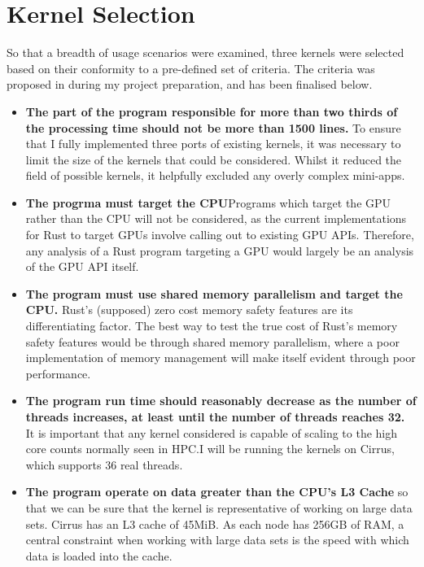 \section{Kernel Selection}
So that a breadth of usage scenarios were examined, three kernels were selected based on their conformity to a pre-defined set of criteria. The criteria was proposed in during my project preparation, and has been finalised below.
\begin{itemize}
  \item \textbf{The part of the program responsible for more than two thirds of the processing time should not be more than 1500 lines.} To ensure that I fully implemented three ports of existing kernels, it was necessary to limit the size of the kernels that could be considered. Whilst it reduced the field of possible kernels, it helpfully excluded any overly complex mini-apps.

  \item \textbf{The progrma must target the CPU}Programs which target the GPU rather than the CPU will not be considered, as the current implementations for Rust to target GPUs involve calling out to existing GPU APIs. Therefore, any analysis of a Rust program targeting a GPU would largely be an analysis of the GPU API itself.

  \item \textbf{The program must use shared memory parallelism and target the CPU.} Rust's (supposed) zero cost memory safety features are its differentiating factor. The best way to test the true cost of Rust's memory safety features would be through shared memory parallelism, where a poor implementation of memory management will make itself evident through poor performance.
  
  \item \textbf{The program run time should reasonably decrease as the number of threads increases, at least until the number of threads reaches 32.} It is important that any kernel considered is capable of scaling to the high core counts normally seen in HPC.I will be running the kernels on Cirrus, which supports 36 real threads.

  \item \textbf{The program operate on data greater than the CPU's L3 Cache} so that we can be sure that the kernel is representative of working on large data sets. Cirrus has an L3 cache of 45MiB. As each node has 256GB of RAM, a central constraint when working with large data sets is the speed with which data is loaded into the cache. 


\end{itemize}
